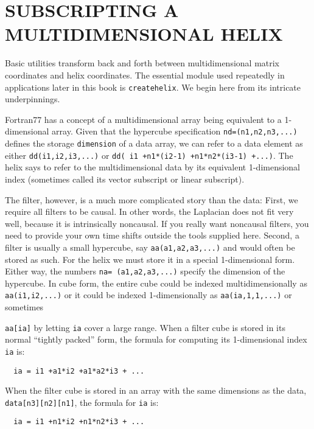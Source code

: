 \section{SUBSCRIPTING A MULTIDIMENSIONAL HELIX}
Basic utilities transform back and forth between
multidimensional matrix coordinates and helix coordinates.
The essential module used repeatedly in applications
later in this book is
\texttt{createhelix}.
We begin here from its intricate underpinnings.

\par
Fortran77 has a concept of a multidimensional array being equivalent
to a 1-dimensional array.
Given that the hypercube specification
\texttt{nd=(n1,n2,n3,...)} defines the storage
\texttt{dimension} of a data array,
we can refer to a data element as either
\texttt{dd(i1,i2,i3,...)} or 
\texttt{dd( i1 +n1*(i2-1) +n1*n2*(i3-1) +...)}.
The helix says to refer to the multidimensional data
by its equivalent 1-dimensional index
(sometimes called its vector subscript or linear subscript).

\par
The filter, however, is a much more complicated story than the data:
First, we require all filters to be causal.
In other words, the Laplacian does not fit very well,
because it is intrinsically noncausal.
If you really want noncausal filters,
you need to provide your own time shifts outside the tools supplied here.
Second, a filter is usually a small hypercube, say
\texttt{aa(a1,a2,a3,...)}
and would often be stored as such.
For the helix we must store it in a special 1-dimensional form.
Either way, the numbers
\texttt{na= (a1,a2,a3,...)}
specify the dimension of the hypercube.
In cube form, the entire cube could be indexed
multidimensionally as \texttt{aa(i1,i2,...)} or it could be indexed
1-dimensionally as \texttt{aa(ia,1,1,...)} or sometimes
\begin{comment}
\footnote{
        Some programming minutia:
        Fortran77 does not allow you to refer to an array
        by both its cartesian coordinates
        and its linear subscript in the same subroutine.
        To access it both ways, you need a subroutine call,
        or you dimension it as 
        \texttt{data(n1,n2,...)}
        and then you refer to it as
        \texttt{data(id,1,1,...)}.
        Fortran90 follows the same rule outside modules.
        Where modules use other modules,
        the compiler does not allow you to refer
        to data both ways,
        unless the array is declared as
        \texttt{allocatable}.
        }
\end{comment}
\texttt{aa[ia]} by letting \texttt{ia} cover a large range.
When a filter cube is stored in its normal ``tightly packed'' form,
the formula for computing
its 1-dimensional index
\texttt{ia} is:
\begin{verbatim}
  ia = i1 +a1*i2 +a1*a2*i3 + ...
\end{verbatim}
When the filter cube is stored in an array
with the same dimensions as the data,
\texttt{data[n3][n2][n1]},
the formula for \texttt{ia} is:
\begin{verbatim}
  ia = i1 +n1*i2 +n1*n2*i3 + ...
\end{verbatim}

